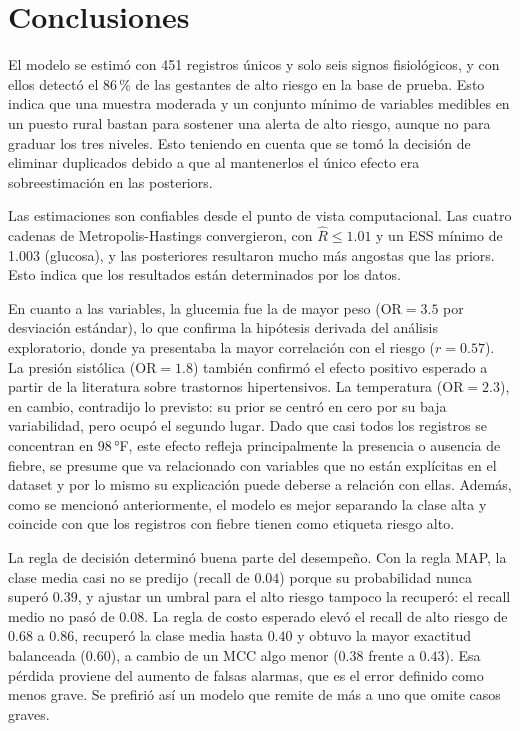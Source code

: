 \section{Conclusiones}

El modelo se estimó con 451 registros únicos y solo seis signos fisiológicos, y
con ellos detectó el 86\,\% de las gestantes de alto riesgo en la base de prueba.
Esto indica que una muestra moderada y un conjunto mínimo de variables medibles
en un puesto rural bastan para sostener una alerta de alto riesgo, aunque no para
graduar los tres niveles. Esto teniendo en cuenta que se tomó la decisión de
eliminar duplicados debido a que al mantenerlos el único efecto era
sobreestimación en las posteriors.

Las estimaciones son confiables desde el punto de vista computacional. Las cuatro
cadenas de Metropolis-Hastings convergieron, con $\hat{R}\leq1.01$ y un ESS mínimo
de 1.003 (glucosa), y las posteriores resultaron mucho más angostas que las
priors. Esto indica que los resultados están determinados por los datos.

En cuanto a las variables, la glucemia fue la de mayor peso ($\mathrm{OR}=3.5$ por
desviación estándar), lo que confirma la hipótesis derivada del análisis
exploratorio, donde ya presentaba la mayor correlación con el riesgo ($r=0.57$).
La presión sistólica ($\mathrm{OR}=1.8$) también confirmó el efecto positivo
esperado a partir de la literatura sobre trastornos hipertensivos. La temperatura
($\mathrm{OR}=2.3$), en cambio, contradijo lo previsto: su prior se centró en cero
por su baja variabilidad, pero ocupó el segundo lugar. Dado que casi todos los
registros se concentran en 98\,°F, este efecto refleja principalmente la presencia
o ausencia de fiebre, se presume que va relacionado con variables que no están
explícitas en el dataset y por lo mismo su explicación puede deberse a relación
con ellas. Además, como se mencionó anteriormente, el modelo es mejor separando
la clase alta y coincide con que los registros con fiebre tienen como etiqueta
riesgo alto.

La regla de decisión determinó buena parte del desempeño. Con la regla MAP, la
clase media casi no se predijo (recall de $0.04$) porque su probabilidad nunca
superó $0.39$, y ajustar un umbral para el alto riesgo tampoco la recuperó: el
recall medio no pasó de $0.08$. La regla de costo esperado elevó el recall de alto
riesgo de $0.68$ a $0.86$, recuperó la clase media hasta $0.40$ y obtuvo la mayor
exactitud balanceada ($0.60$), a cambio de un MCC algo menor ($0.38$ frente a
$0.43$). Esa pérdida proviene del aumento de falsas alarmas, que es el error
definido como menos grave. Se prefirió así un modelo que remite de más a uno que
omite casos graves.

